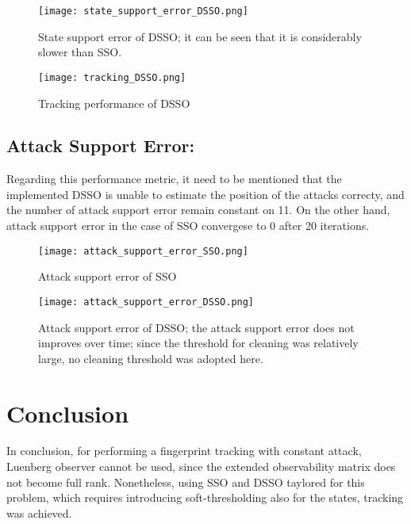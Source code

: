 \begin{figure}[H] %
    \centering
    \texttt{[image: state\_support\_error\_DSSO.png]} %
    \caption{State support error of DSSO; it can be seen that it is considerably slower than SSO.}
\end{figure}

\begin{figure}[H] %
    \centering
    \texttt{[image: tracking\_DSSO.png]} %
    \caption{Tracking performance of DSSO}
\end{figure}
\subsection{Attack Support Error:}
Regarding this performance metric, it need to be mentioned that the implemented DSSO is unable to estimate the position of the attacks correcty, and the number of attack support error remain constant on 11. On the other hand, attack support error in the case of SSO convergese to 0 after 20 iterations.
\begin{figure}[H] %
    \centering
    \texttt{[image: attack\_support\_error\_SSO.png]} %
    \caption{Attack support error of SSO}
\end{figure}

\begin{figure}[H] %
    \centering
    \texttt{[image: attack\_support\_error\_DSSO.png]} %
    \caption{Attack support error of DSSO; the attack support error does not improves over time; since the threshold for cleaning was relatively large, no cleaning threshold was adopted here.}
\end{figure}


\section{Conclusion}
In conclusion, for performing a fingerprint tracking with constant attack, Luenberg observer cannot be used, since the extended observability matrix does not become full rank. Nonetheless, using SSO and DSSO taylored for this problem, which requires introducing soft-thresholding also for the states, tracking was achieved. 

